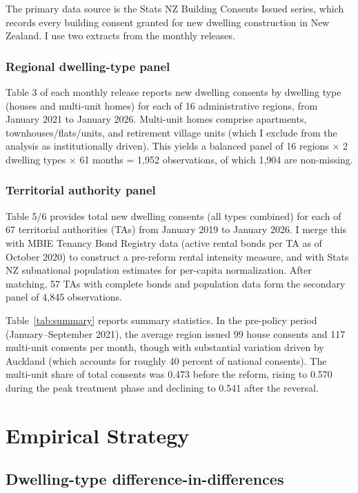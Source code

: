 \documentclass[12pt]{article}
\begin{document}
The primary data source is the Stats NZ Building Consents Issued series, which records every building consent granted for new dwelling construction in New Zealand. I use two extracts from the monthly releases.

\subsubsection*{Regional dwelling-type panel} Table 3 of each monthly release reports new dwelling consents by dwelling type (houses and multi-unit homes) for each of 16 administrative regions, from January 2021 to January 2026. Multi-unit homes comprise apartments, townhouses/flats/units, and retirement village units (which I exclude from the analysis as institutionally driven). This yields a balanced panel of 16 regions $\times$ 2 dwelling types $\times$ 61 months = 1,952 observations, of which 1,904 are non-missing.

\subsubsection*{Territorial authority panel} Table 5/6 provides total new dwelling consents (all types combined) for each of 67 territorial authorities (TAs) from January 2019 to January 2026. I merge this with MBIE Tenancy Bond Registry data (active rental bonds per TA as of October 2020) to construct a pre-reform rental intensity measure, and with Stats NZ subnational population estimates for per-capita normalization. After matching, 57 TAs with complete bonds and population data form the secondary panel of 4,845 observations.



Table~\ref{tab:summary} reports summary statistics. In the pre-policy period (January--September 2021), the average region issued 99 house consents and 117 multi-unit consents per month, though with substantial variation driven by Auckland (which accounts for roughly 40 percent of national consents). The multi-unit share of total consents was 0.473 before the reform, rising to 0.570 during the peak treatment phase and declining to 0.541 after the reversal.


\section{Empirical Strategy}
\label{sec:strategy}

\subsection{Dwelling-type difference-in-differences}
\end{document}
